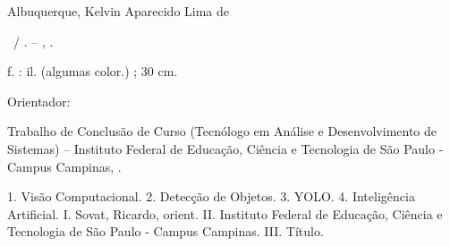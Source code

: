 \documentclass[
	12pt,				%
	openright,			%
	oneside,			%
	a4paper,			%
	chapter=TITLE,		%
	english,			%
	brazil				%
	]{abntex2}
\begin{document}
\frenchspacing 

\imprimircapa
\imprimirfolhaderosto

\begin{fichacatalografica}
	\vspace*{\fill}					%
	\begin{center}					%
	\begin{minipage}[c][8cm]{13.5cm}	%
	\small
	Albuquerque, Kelvin Aparecido Lima de
	\par
	\imprimirtitulo\ / \imprimirautor. -- \imprimirlocal, \imprimirdata.
	\par
	\pageref{LastPage} f. : il. (algumas color.) ; 30 cm.
	\par
	Orientador: \imprimirorientador
	\par
	Trabalho de Conclusão de Curso (Tecnólogo em Análise e Desenvolvimento de Sistemas) -- Instituto Federal de Educação, Ciência e Tecnologia de São Paulo - Campus Campinas, \imprimirdata.
	\par
	1. Visão Computacional.
	2. Detecção de Objetos.
	3. YOLO.
	4. Inteligência Artificial.
	I. Sovat, Ricardo, orient.
	II. Instituto Federal de Educação, Ciência e Tecnologia de São Paulo - Campus Campinas.
	III. Título.
	\end{minipage}
	\end{center}
\end{fichacatalografica}
\end{document}
